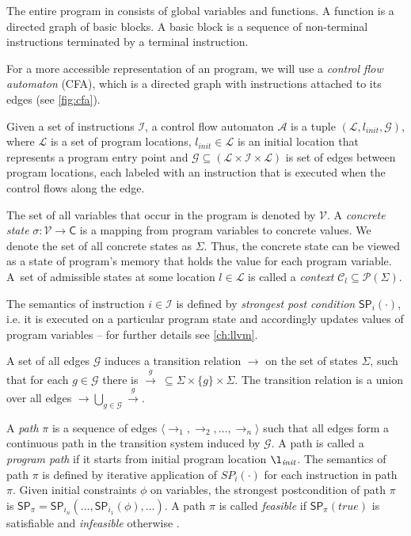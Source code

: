 The entire program in \llvm consists of global variables and functions.  A
function is a directed graph of basic blocks. A basic block is a sequence of
non-terminal instructions terminated by a terminal instruction.

For a more accessible representation of an \llvm program, we will use a
\emph{control flow automaton} (CFA), which is a directed graph with \llvm
instructions attached to its edges (see \autoref{fig:cfa}).

\begin{definition}
    Given a set of instructions $\mathcal{I}$, a control flow automaton
    $\mathcal{A}$ is a tuple $(\mathcal{L}, l_{\textit{init}}, \mathcal{G})$,
    where $\mathcal{L}$ is a set of program locations, $l_{\textit{init}} \in
    \mathcal{L}$ is an initial location that represents a program entry point
    and $\mathcal{G} \subseteq (\mathcal{L} \times \mathcal{I} \times
    \mathcal{L})$ is set of edges between program locations, each labeled with
    an instruction that is executed when the control flows along the edge.
\end{definition}

The set of all variables that occur in the \llvm program is denoted by
$\mathcal{V}$. A \emph{concrete state} $\sigma : \mathcal{V} \rightarrow
\mathsf{C}$ is a mapping from program variables to concrete values. We denote
the set of all concrete states as $\Sigma$. Thus, the concrete state can be
viewed as a state of program's memory that holds the value for each program
variable. A~set of admissible states at some location $l \in \mathcal{L}$ is
called a \emph{context} $\mathcal{C}_l \subseteq \mathcal{P}(\Sigma)$.

The semantics of instruction $i \in \mathcal{I}$ is defined by \emph{strongest
post condition} $\textsf{SP}_{i}(\cdot)$, i.e. it is executed on a particular program
state and accordingly updates values of program variables -- for further details
see \autoref{ch:llvm}.

A set of all edges $\mathcal{G}$ induces a transition relation $\rightarrow$ on
the set of states $\Sigma$, such that for each $g \in \mathcal{G}$ there is
$\xrightarrow{g} \: \subseteq \Sigma \times \{g\} \times \Sigma$. The
transition relation is a union over all edges $\rightarrow \bigcup_{g
\in\mathcal{G}} \xrightarrow{g}$.

A \emph{path} $\pi$ is a sequence of edges $\langle
\rightarrow_1, \rightarrow_2, \dots, \rightarrow_n \rangle$ such that all edges
form a continuous path in the transition system induced by $\mathcal{G}$.  A path
is called a \emph{program path} if it starts from initial program location
$\l_{\textit{init}}$. The semantics of path $\pi$ is defined by iterative
application of $SP_{i}( \cdot )$ for each instruction in path $\pi$. Given
initial constraints $\phi$ on variables, the strongest postcondition of path
$\pi$ is $\textsf{SP}_{\pi} = \textsf{SP}_{i_n}(\dots,\textsf{SP}_{i_1}(\phi),\dots)$. A
path $\pi$ is called \emph{feasible} if $\textsf{SP}_{\pi}(\textit{true})$ is
satisfiable and \emph{infeasible} otherwise \cite{Beyer2018b}.

